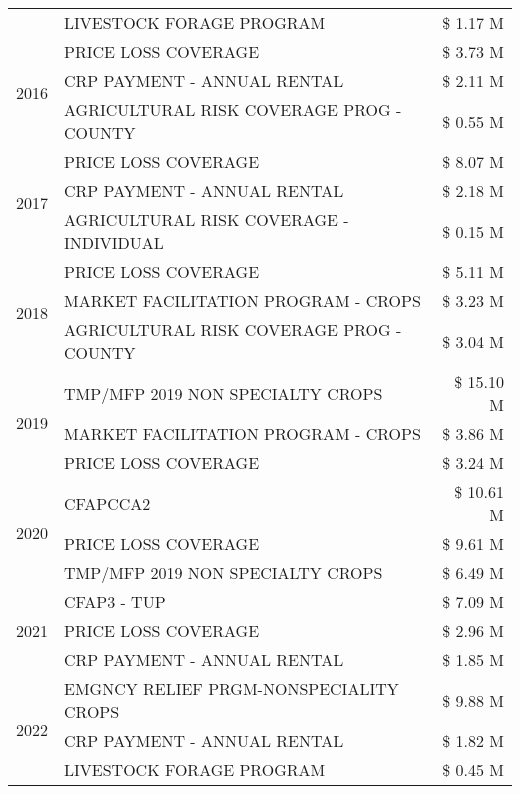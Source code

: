 \begin{tabular}{llr}
 & LIVESTOCK FORAGE PROGRAM & \$ 1.17 M \\
\cline{1-3}
\multirow[t]{3}{*}{2016} & PRICE LOSS COVERAGE & \$ 3.73 M \\
 & CRP PAYMENT - ANNUAL RENTAL & \$ 2.11 M \\
 & AGRICULTURAL RISK COVERAGE PROG - COUNTY & \$ 0.55 M \\
\cline{1-3}
\multirow[t]{3}{*}{2017} & PRICE LOSS COVERAGE & \$ 8.07 M \\
 & CRP PAYMENT - ANNUAL RENTAL & \$ 2.18 M \\
 & AGRICULTURAL RISK COVERAGE - INDIVIDUAL & \$ 0.15 M \\
\cline{1-3}
\multirow[t]{3}{*}{2018} & PRICE LOSS COVERAGE & \$ 5.11 M \\
 & MARKET FACILITATION PROGRAM - CROPS & \$ 3.23 M \\
 & AGRICULTURAL RISK COVERAGE PROG - COUNTY & \$ 3.04 M \\
\cline{1-3}
\multirow[t]{3}{*}{2019} & TMP/MFP 2019 NON SPECIALTY CROPS & \$ 15.10 M \\
 & MARKET FACILITATION PROGRAM - CROPS & \$ 3.86 M \\
 & PRICE LOSS COVERAGE & \$ 3.24 M \\
\cline{1-3}
\multirow[t]{3}{*}{2020} & CFAPCCA2 & \$ 10.61 M \\
 & PRICE LOSS COVERAGE & \$ 9.61 M \\
 & TMP/MFP 2019 NON SPECIALTY CROPS & \$ 6.49 M \\
\cline{1-3}
\multirow[t]{3}{*}{2021} & CFAP3 - TUP & \$ 7.09 M \\
 & PRICE LOSS COVERAGE & \$ 2.96 M \\
 & CRP PAYMENT - ANNUAL RENTAL & \$ 1.85 M \\
\cline{1-3}
\multirow[t]{3}{*}{2022} & EMGNCY RELIEF PRGM-NONSPECIALITY CROPS & \$ 9.88 M \\
 & CRP PAYMENT - ANNUAL RENTAL & \$ 1.82 M \\
 & LIVESTOCK FORAGE PROGRAM & \$ 0.45 M \\
\cline{1-3}
\bottomrule
\end{tabular}
